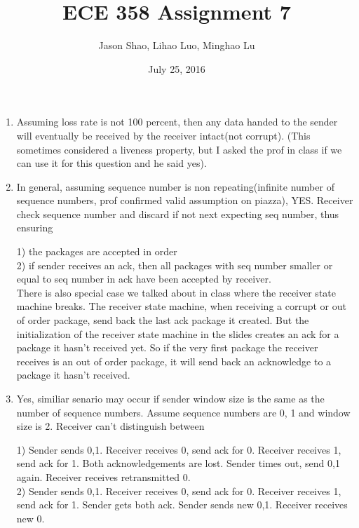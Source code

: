 \documentclass[12pt]{article}
\title{ECE 358 Assignment 7}
\author{Jason Shao, Lihao Luo, Minghao Lu}
\date{July 25, 2016}
\begin{document}
\maketitle
\renewcommand{\thesubsection}{Problem \arabic{subsection}}


\def\question#1{\item[\bf #1.]}
\def\part#1{\item[\bf #1)]}
\newcommand{\pc}[1]{\mbox{\textbf{#1}}} %

\begin{enumerate}
	\item
		Assuming loss rate is not 100 percent, then any data handed to the sender
		will eventually be received by the receiver intact(not corrupt). 
		(This sometimes considered a liveness property, but I asked the prof in class if we 
		can use it for this question and he said yes).
	\item
		In general, assuming sequence number is non repeating(infinite number of sequence
		numbers, prof confirmed valid assumption on piazza), YES. Receiver check sequence
		number and discard if not next expecting seq number, thus ensuring

		1) the packages are accepted in order \\
		2) if sender receives an ack, then all packages with seq number smaller or equal to seq 
		number in ack have been accepted by receiver. \\

		There is also special case we talked about in class where the receiver state machine
		breaks. The receiver state machine, when receiving a corrupt or out of order package,
		send back the last ack package it created. But the initialization of the  receiver
		state machine in the slides creates an ack for a package it hasn't received yet. 
		So if the very first package the receiver receives is an out of order package, it will
		send back an acknowledge to a package it hasn't received.

	\item
		Yes, similiar senario may occur if sender window size is the same as the number of sequence numbers.
		Assume sequence numbers are 0, 1 and window size is 2. Receiver can't distinguish between
		
		1) Sender sends 0,1. Receiver receives 0, send ack for 0. Receiver receives 1, 
		send ack for 1. Both acknowledgements are lost.  Sender times out, send 0,1 again. 
		Receiver receives retransmitted 0.\\
		2) Sender sends 0,1. Receiver receives 0, send ack for 0. Receiver receives 1,
		send ack for 1. Sender gets both ack. Sender sends new 0,1. Receiver receives new 0.


\end{enumerate}
\end{document}
